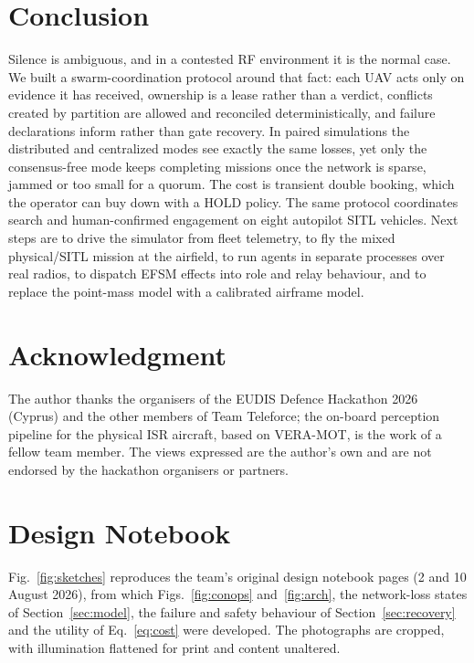 \documentclass[conference]{IEEEtran}
\newcommand{\stt}[1]{\textsf{#1}}     %
\begin{document}
\section{Conclusion}
\label{sec:conclusion}

Silence is ambiguous, and in a contested RF environment it is the normal
case. We built a swarm-coordination protocol around that fact: each UAV acts
only on evidence it has received, ownership is a lease rather than a verdict,
conflicts created by partition are allowed and reconciled deterministically,
and failure declarations inform rather than gate recovery. In paired
simulations the distributed and centralized modes see exactly the same
losses, yet only the consensus-free mode keeps completing missions once the
network is sparse, jammed or too small for a quorum. The cost is transient
double booking, which the operator can buy down with a \stt{HOLD} policy.
The same protocol coordinates search and human-confirmed engagement on eight
autopilot SITL vehicles. Next steps are to drive the simulator from fleet
telemetry, to fly the mixed physical/SITL mission at the airfield, to run
agents in separate processes over real radios, to dispatch EFSM effects into
role and relay behaviour, and to replace the point-mass model with a
calibrated airframe model.

\section*{Acknowledgment}
The author thanks the organisers of the EUDIS Defence Hackathon 2026
(Cyprus) and the other members of Team Teleforce; the on-board perception
pipeline for the physical ISR aircraft, based on VERA-MOT, is the work of a
fellow team member. The views expressed are the author's own and are not
endorsed by the hackathon organisers or partners.




\appendices

\section{Design Notebook}
\label{app:sketches}

Fig.~\ref{fig:sketches} reproduces the team's original design notebook pages
(2 and 10 August 2026), from which Figs.~\ref{fig:conops} and~\ref{fig:arch},
the network-loss states of Section~\ref{sec:model}, the failure and safety
behaviour of Section~\ref{sec:recovery} and the utility of
Eq.~\eqref{eq:cost} were developed. The photographs are cropped, with
illumination flattened for print and content unaltered.
\end{document}

